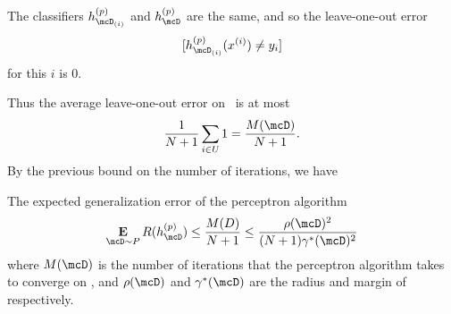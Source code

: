 The classifiers $h_{\mcD_{(i)}}^{(p)}$ and $h_{\mcD}^{(p)}$ are the same,
and so the leave-one-out error \[
    [h_{\mcD_{(i)}}^{(p)}(x^{(i)}) \ne y_i]
\] for this $i$ is $0$.

Thus the average leave-one-out error on \mcD\ is at most \[
    \frac1{N+1} \sum_{i \in U} 1 = \frac{M(\mcD)}{N+1}.
\] By the previous bound on the number of iterations, we have
\begin{theorem*} \label{thm:perceptron:error}
    The expected generalization error of the perceptron algorithm \[
        \E_{\mcD \sim P} R(h_\mcD^{(p)})
            \le \frac{M(D)}{N + 1}
            \le \frac{\rho(\mcD)^2}{(N+1) \gamma^{*}(\mcD)^2}
    \] where $M(\mcD)$ is the number of iterations that the perceptron
    algorithm takes to converge on \mcD,
    and $\rho(\mcD)$ and $\gamma^{*}(\mcD)$ are the radius and margin
    of \mcD{} respectively.
\end{theorem*}
